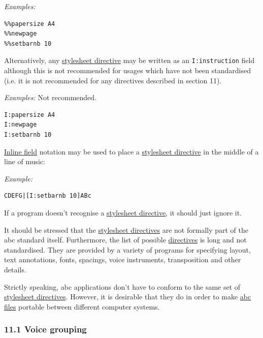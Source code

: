 \documentclass[oneside]{book}
\begin{document}
\emph{Examples:}

\begin{verbatim}
%%papersize A4
%%newpage
%%setbarnb 10
\end{verbatim}

Alternatively, any
\protect\hyperlink{stylesheet_directive_definition}{stylesheet
directive} may be written as an \texttt{I:instruction} field although
this is not recommended for usages which have not been standardised
(i.e. it is not recommended for any directives described in section 11).

\emph{Examples:} Not recommended.

\begin{verbatim}
I:papersize A4
I:newpage
I:setbarnb 10
\end{verbatim}

\protect\hyperlink{inline_field_definition}{Inline field} notation may
be used to place a
\protect\hyperlink{stylesheet_directive_definition}{stylesheet
directive} in the middle of a line of music:

\emph{Example:}

\begin{verbatim}
CDEFG|[I:setbarnb 10]ABc
\end{verbatim}

If a program doesn't recognise a
\protect\hyperlink{stylesheet_directive_definition}{stylesheet
directive}, it should just ignore it.

It should be stressed that the
\protect\hyperlink{stylesheet_directive_definition}{stylesheet
directives} are not formally part of the abc standard itself.
Furthermore, the list of possible
\protect\hyperlink{stylesheet_directive_definition}{directives} is long
and not standardised. They are provided by a variety of programs for
specifying layout, text annotations, fonts, spacings, voice instruments,
transposition and other details.

Strictly speaking, abc applications don't have to conform to the same
set of \protect\hyperlink{stylesheet_directive_definition}{stylesheet
directives}. However, it is desirable that they do in order to make
\protect\hyperlink{abc_file_definition}{abc files} portable between
different computer systems.

\hypertarget{voice_grouping}{\subsubsection{11.1 Voice
grouping}\label{voice_grouping}}
\end{document}
